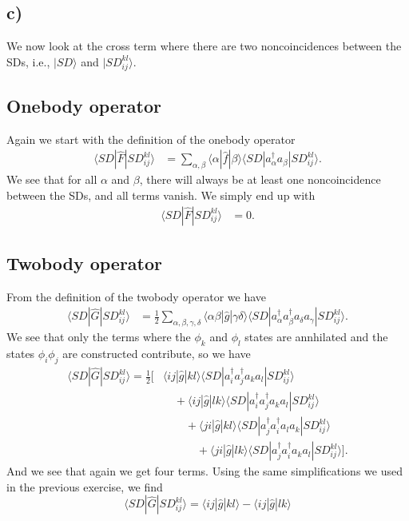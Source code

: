 \documentclass[a4paper, 11pt, notitlepage, english]{article}
\newcommand{\ket}[1]{|#1 \rangle}
\newcommand{\op}[1]{\hat{#1}}
\newcommand{\braopket}[3]{\langle #1 | {#2} | #3 \rangle}
\begin{document}
\clearpage

\subsection*{c)}
We now look at the cross term where there are two noncoincidences between the SDs, i.e., $\ket{SD}$ and $\ket{SD_{ij}^{kl}}$.

\subsection*{Onebody operator}
Again we start with the definition of the onebody operator
\begin{align*}
\braopket{SD}{\op{F}}{SD_{ij}^{kl}} 
&= \sum_{\alpha, \beta} \braopket{\alpha}{\op{f}}{\beta}\braopket{SD}{a_\alpha^\dag a_\beta}{SD_{ij}^{kl}}.
\end{align*}
We see that for all $\alpha$ and $\beta$, there will always be at least one noncoincidence between the SDs, and all terms vanish. We simply end up with
\begin{align*}
\braopket{SD}{\op{F}}{SD_{ij}^{kl}} 
&= 0.
\end{align*}

\subsection*{Twobody operator}
From the definition of the twobody operator we have
\begin{align*}
\braopket{SD}{\op{G}}{SD_{ij}^{kl}}
&= \frac{1}{2}\sum_{\alpha, \beta, \gamma, \delta} \braopket{\alpha\beta}{\op{g}}{\gamma\delta}\braopket{SD}{a_\alpha^\dag a_\beta^\dag a_\delta a_\gamma}{SD_{ij}^{kl}}.
\end{align*}
We see that only the terms where the $\phi_k$ and $\phi_l$ states are annhilated and the states $\phi_i \phi_j$ are constructed contribute, so we have
\begin{align*}
\braopket{SD}{\op{G}}{SD_{ij}^{kl}}
= \frac{1}{2}\big[
&\braopket{i j}{\op{g}}{k l}\braopket{SD}{a_i^\dag a_j^\dag a_k a_l}{SD_{ij}^{kl}} \\[-0.1cm]
&\quad+ \braopket{i j}{\op{g}}{l k}\braopket{SD}{a_i^\dag a_j^\dag a_k a_l}{SD_{ij}^{kl}} \\
&\qquad+ \braopket{j i}{\op{g}}{k l}\braopket{SD}{a_j^\dag a_i^\dag a_l a_k}{SD_{ij}^{kl}} \\
&\qquad\quad+ \braopket{j i}{\op{g}}{l k}\braopket{SD}{a_j^\dag a_i^\dag a_k a_l}{SD_{ij}^{kl}}\big].
\end{align*}
And we see that again we get four terms. Using the same simplifications we used in the previous exercise, we find
$$\braopket{SD}{\op{G}}{SD_{ij}^{kl}} = \braopket{ij}{\op{g}}{kl} - \braopket{ij}{\op{g}}{lk}$$
\end{document}
